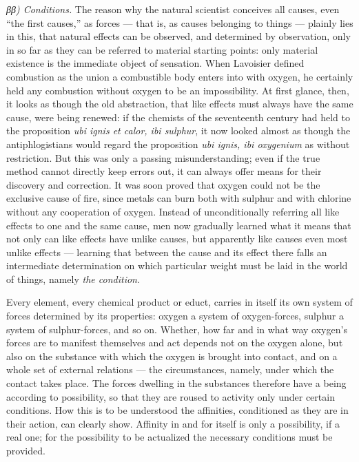 \documentclass[12pt,a4paper]{book}
\begin{document}
\emph{ββ) Conditions.} The reason why the natural scientist conceives all
causes, even ``the first causes,'' as forces --- that is, as causes belonging
to things --- plainly lies in this, that natural effects can be observed, and
determined by observation, only in so far as
they can be referred to material starting points: only material existence is
the immediate object of sensation. When Lavoisier defined combustion as the
union a combustible body enters into with oxygen, he certainly held any
combustion without oxygen to be an impossibility. At first glance, then, it
looks as though the old abstraction, that like effects must always have the
same cause, were being renewed: if the chemists of the seventeenth century had
held to the proposition \textit{ubi ignis et calor, ibi sulphur}, it now looked
almost as though the antiphlogistians would regard the proposition
\textit{ubi ignis, ibi oxygenium} as without restriction. But this was only a
passing misunderstanding; even if the true method cannot directly keep errors
out, it can always offer means for their discovery and correction. It was soon
proved that oxygen could not be the exclusive cause of fire, since metals can
burn both with sulphur and with chlorine without any cooperation of oxygen.
Instead of unconditionally referring all like effects to one and the same
cause, men now gradually learned what it means that not only can like effects
have unlike causes, but apparently like causes even most unlike effects ---
learning that between the cause and its effect there falls an intermediate
determination on which particular weight must be laid in the world of things,
namely \emph{the condition}.

Every element, every chemical product or educt, carries in itself its own
system of forces determined by its properties: oxygen a system of
oxygen-forces, sulphur a system of sulphur-forces, and so on. Whether, how far
and in what way oxygen's forces are to manifest themselves and act depends not
on the oxygen alone, but also on the substance with which the oxygen is brought
into contact, and on a whole set of external relations --- the circumstances,
namely, under which the contact takes place. The forces dwelling in the
substances therefore have a being according to
possibility, so that they are roused to activity only under certain conditions.
How this is to be understood the affinities, conditioned as they are in their
action, can clearly show. Affinity in and for itself is only a possibility, if
a real one; for the possibility to be actualized the necessary conditions must
be provided.
\end{document}
